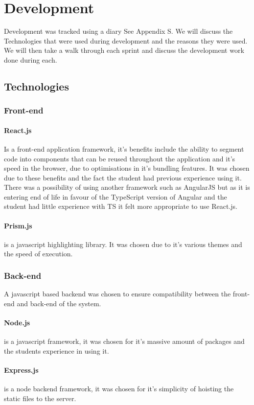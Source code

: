\section{Development}
Development was tracked using a diary See Appendix S.
\newline
We will discuss the Technologies that were used during development and the reasons they were used. We will then take a walk through 
each sprint and discuss the development work done during each.
\subsection{Technologies}
\subsubsection{Front-end}
\paragraph{React.js} \cite{react} Is a front-end application framework, it's benefits include the ability to segment code into 
components that can be reused throughout the application and it's speed in the browser, due to optimisations in it's bundling features. It was chosen 
due to these benefits and the fact the student had previous experience using it. 
There was a possibility of using another framework such as AngularJS \cite{angularjs} but as it is entering end of life in favour of the TypeScript 
version of Angular and the student had little experience with TS it felt more appropriate to use React.js.
\paragraph{Prism.js} \cite{prism} is a javascript highlighting library. It was chosen due to it's various themes and the speed of execution.
\subsubsection{Back-end}
A javascript based backend was chosen to ensure compatibility between the front-end and back-end of the system.
\paragraph{Node.js} \cite{node.js} is a javascript framework, it was chosen for it's massive amount of packages and the students experience in 
using it.
\paragraph{Express.js} \cite{express} is a node backend framework, it was chosen for it's simplicity of hoisting the static files to the 
server.

